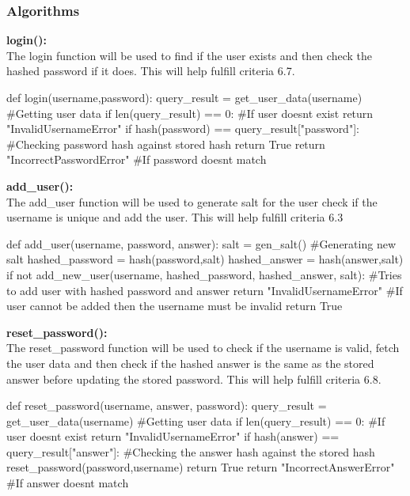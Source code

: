 \documentclass{article}
\begin{document}
        \subsubsection{Algorithms}
        \textbf{login():}\\
        The login function will be used to find if the user exists and then check the hashed password if it does. This will help fulfill criteria 6.7.\\
        \begin{python}
def login(username,password):
   query_result = get_user_data(username) #Getting user data
   if len(query_result) == 0: #If user doesnt exist
      return "InvalidUsernameError" 
   if hash(password) == query_result["password"]: #Checking password hash against stored hash
      return True
   return "IncorrectPasswordError" #If password doesnt match
        \end{python}
        \textbf{add\_user():}\\
        The add\_user function will be used to generate salt for the user check if the username is unique and add the user. This will help fulfill criteria 6.3\\
        \begin{python}
def add_user(username, password, answer):
   salt = gen_salt() #Generating new salt
   hashed_password = hash(password,salt)
   hashed_answer = hash(answer,salt)
   if not add_new_user(username, hashed_password, hashed_answer, salt): #Tries to add user with hashed password and answer
      return "InvalidUsernameError" #If user cannot be added then the username must be invalid
   return True
        \end{python}
        \textbf{reset\_password():}\\
        The reset\_password function will be used to check if the username is valid, fetch the user data and then check if the hashed answer is the same as the stored answer before updating the stored password. This will help fulfill criteria 6.8.\\
        \begin{python}
def reset_password(username, answer, password):
   query_result = get_user_data(username) #Getting user data
   if len(query_result) == 0: #If user doesnt exist
      return "InvalidUsernameError"
   if hash(answer) == query_result["answer"]: #Checking the answer hash against the stored hash
      reset_password(password,username)
      return True
   return "IncorrectAnswerError" #If answer doesnt match
        \end{python}
\end{document}
